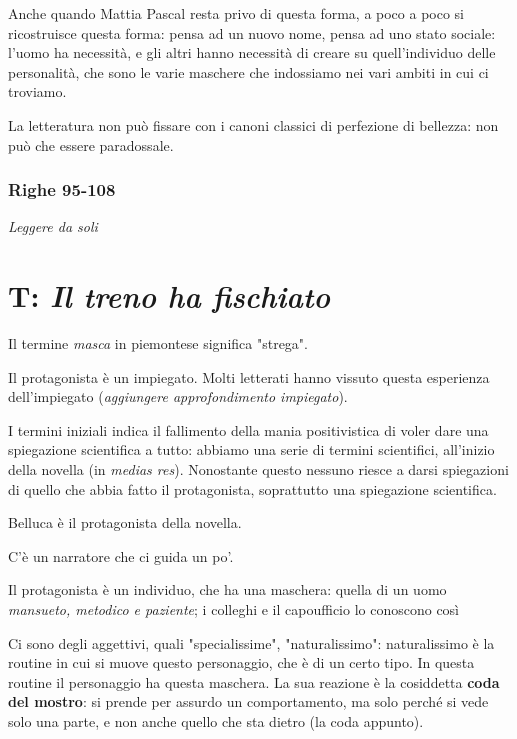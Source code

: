 Anche quando Mattia Pascal resta privo di questa forma, a poco a poco si ricostruisce questa forma: pensa ad un nuovo nome, pensa ad uno stato sociale: l'uomo ha necessità, e gli altri hanno necessità di creare su quell'individuo delle personalità, che sono le varie maschere che indossiamo nei vari ambiti in cui ci troviamo.

La letteratura non può fissare con i canoni classici di perfezione di bellezza: non può che essere paradossale.

\subsection{Righe 95-108}

\emph{Leggere da soli}


\chapter{T: \textit{Il treno ha fischiato}}

Il termine \textit{masca} in piemontese significa "strega".

Il protagonista è un impiegato. Molti letterati hanno vissuto questa esperienza dell'impiegato (\emph{aggiungere approfondimento impiegato}).

I termini iniziali indica il fallimento della mania positivistica di voler dare una spiegazione scientifica a tutto: abbiamo una serie di termini scientifici, all'inizio della novella (in \textit{medias res}).
Nonostante questo nessuno riesce a darsi spiegazioni di quello che abbia fatto il protagonista, soprattutto una spiegazione scientifica.

Belluca è il protagonista della novella.

C'è un narratore che ci guida un po'.

Il protagonista è un individuo, che ha una maschera: quella di un uomo \textit{mansueto, metodico e paziente}; i colleghi e il capoufficio lo conoscono così

Ci sono degli aggettivi, quali "specialissime", "naturalissimo": naturalissimo è la routine in cui si muove questo personaggio, che è di un certo tipo. In questa routine il personaggio ha questa maschera. La sua reazione è la cosiddetta \textbf{coda del mostro}: si prende per assurdo un comportamento, ma solo perché si vede solo una parte, e non anche quello che sta dietro (la coda appunto).


